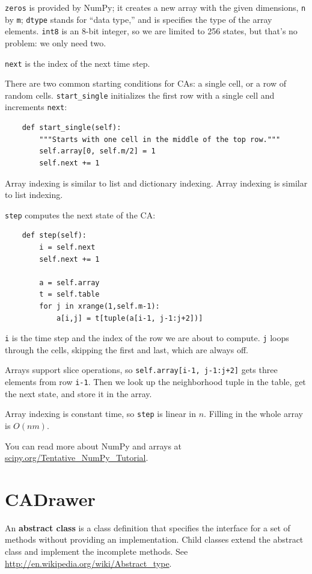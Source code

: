 \documentclass[10pt]{book}
\begin{document}
{\tt zeros} is provided by NumPy; it creates a new array with
the given dimensions, {\tt n} by {\tt m}; {\tt dtype} stands
for ``data type,'' and is specifies the type of the array elements.
{\tt int8} is an 8-bit integer, so we are limited to 256 states,
but that's no problem: we only need two.

{\tt next} is the index of the next time step.

There are two common starting conditions for CAs: a single cell, or a row
of random cells.  \verb"start_single" initializes the first row with
a single cell and increments {\tt next}:

\begin{verbatim}
    def start_single(self):
        """Starts with one cell in the middle of the top row."""
        self.array[0, self.m/2] = 1
        self.next += 1
\end{verbatim}
%
Array indexing is similar to list and dictionary indexing.
Array indexing is similar to list indexing.

{\tt step} computes the next state of the CA:

\begin{verbatim}
    def step(self):
        i = self.next
        self.next += 1

        a = self.array
        t = self.table
        for j in xrange(1,self.m-1):
            a[i,j] = t[tuple(a[i-1, j-1:j+2])]
\end{verbatim}

{\tt i} is the time step and the index of the row we are about to
compute.  {\tt j} loops through the cells, skipping the first and
last, which are always off.

Arrays support slice operations, so {\tt self.array[i-1, j-1:j+2]}
gets three elements from row {\tt i-1}.
Then we look up the neighborhood tuple in the table, get
the next state, and store it in the array.

Array indexing is constant time, so {\tt step} is linear in $n$.
Filling in the whole array is $O(nm)$.

You can read more about NumPy and arrays at
\url{scipy.org/Tentative_NumPy_Tutorial}.


\section{CADrawer}

An {\bf abstract class} is a class definition that specifies the
interface for a set of methods without providing an implementation.
Child classes extend the abstract class and implement the incomplete
methods.  See \url{http://en.wikipedia.org/wiki/Abstract_type}.
\end{document}
